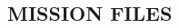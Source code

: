 \documentclass[Space_Shuttle_Ultra_Manual.tex]{subfiles}
\begin{document}
\begin{multicols}{2}
\section{\large MISSION FILES}

\end{multicols}
\end{document}
